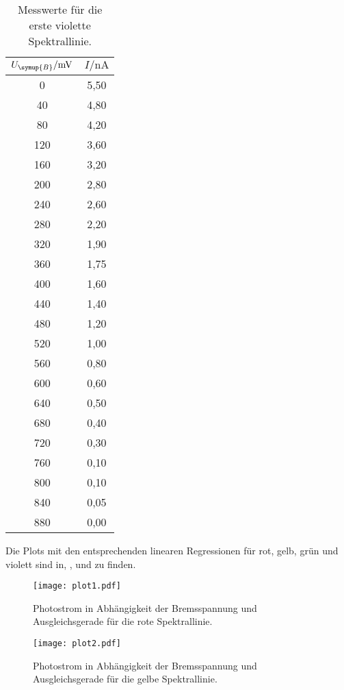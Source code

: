 \begin{table}[!hbt]
    \centering
    \caption{Messwerte für die erste violette Spektrallinie.}
    \label{tab:violett1}
    \begin{tabular}{c c}
        \toprule
        $U_{\symup{B}} / \unit{\milli\volt}$ & $I / \unit{\nano\ampere}$ \\
        \midrule
          0 & 5,50 \\
         40 & 4,80 \\
         80 & 4,20 \\
        120 & 3,60 \\
        160 & 3,20 \\
        200 & 2,80 \\
        240 & 2,60 \\
        280 & 2,20 \\
        320 & 1,90 \\
        360 & 1,75 \\
        400 & 1,60 \\
        440 & 1,40 \\
        480 & 1,20 \\
        520 & 1,00 \\
        560 & 0,80 \\
        600 & 0,60 \\
        640 & 0,50 \\
        680 & 0,40 \\
        720 & 0,30 \\
        760 & 0,10 \\
        800 & 0,10 \\
        840 & 0,05 \\
        880 & 0,00 \\
        \bottomrule
    \end{tabular}
\end{table}

Die Plots mit den entsprechenden linearen Regressionen für rot, gelb, grün und violett sind in, , und zu finden.
\begin{figure}[!hbt]
    \centering
    \label{fig:rot}
    \caption{Photostrom in Abhängigkeit der Bremsspannung und Ausgleichsgerade für die rote Spektrallinie.}
    \texttt{[image: plot1.pdf]}
\end{figure}

\begin{figure}[!hbt]
    \centering
    \label{fig:gelb}
    \caption{Photostrom in Abhängigkeit der Bremsspannung und Ausgleichsgerade für die gelbe Spektrallinie.}
    \texttt{[image: plot2.pdf]}
\end{figure}


